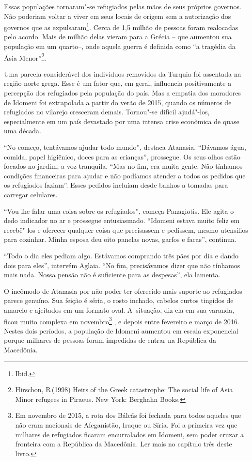 Essas populações tornaram"-se refugiados pelas mãos de seus próprios
governos. Não poderiam voltar a viver em seus locais de origem sem a
autorização dos governos que as expulsaram\footnote{ Ibid.}. Cerca
de 1,5 milhão de pessoas foram realocadas pelo acordo. Mais de milhão
delas vieram para a Grécia -- que aumentou sua população em um quarto--,
onde aquela guerra é definida como ``a tragédia da Ásia
Menor''\footnote{ Hirschon, R\,(1998) Heirs of the Greek
catastrophe: The social life of Asia Minor refugees in Piraeus. New
York: Berghahn Books.}.

Uma parcela considerável dos indivíduos removidos da Turquia foi
assentada na região norte grega. Esse é um fator que, em geral,
influencia positivamente a percepção dos refugiados pela população do
país. Mas a empatia dos moradores de Idomeni foi extrapolada a partir do
verão de 2015, quando os números de refugiados no vilarejo cresceram
demais. Tornou"-se difícil ajudá"-los, especialmente em um país devastado
por uma intensa crise econômica de quase uma década.

``No começo, tentávamos ajudar todo mundo'', destaca Atanasia. ``Dávamos
água, comida, papel higiênico, doces para as crianças'', prossegue.
Os seus olhos estão focados no jardim, a voz tranquila. ``Mas no fim, era
muita gente. Não tínhamos condições financeiras para ajudar e não
podíamos atender a todos os pedidos que os refugiados faziam''.
Esses pedidos incluíam desde banhos a tomadas para carregar celulares.

``Vou lhe falar uma coisa sobre os refugiados'', começa Panagiotis. Ele
agita o dedo indicador no ar e prossegue entusiasmado. ``Idomeni estava
muito feliz em recebê"-los e oferecer qualquer coisa que precisassem e
pedissem, mesmo utensílios para cozinhar. Minha esposa deu
oito panelas novas, garfos e facas'', continua.

``Todo o dia eles pediam algo. Estávamos comprando três pães por dia e
dando dois para eles'', intervém Aglaia. ``No fim, precisávamos dizer
que não tínhamos mais nada. Nossa pensão não é suficiente para as
despesas'', ela lamenta.

O incômodo de Atanasia por não poder ter oferecido mais suporte ao
refugiados parece genuíno. Sua feição é séria, o rosto inchado, cabelos
curtos tingidos de amarelo e ajeitados em um formato oval. A~situação,
diz ela em sua varanda, ficou muito complexa em
novembro\footnote{ Em novembro de 2015, a rota dos Bálcãs foi
fechada para todos aqueles que não eram nacionais de Afeganistão, Iraque
ou Síria. Foi a primeira vez que milhares de refugiados ficaram
encurralados em Idomeni, sem poder cruzar a fronteira com a República da
Macedônia. Ler mais no capítulo três deste livro.} , e depois entre fevereiro e março de
2016. Nestes dois períodos, a população de Idomeni aumentou em escala
exponencial porque milhares de pessoas foram impedidas de entrar na
República da Macedônia.
% 
% 
% 


